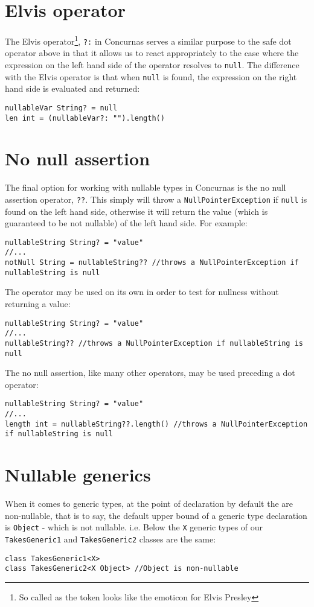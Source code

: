 \documentclass[conc-doc]{subfiles}
\begin{document}
\section{Elvis operator}
The Elvis operator\footnote{So called as the token looks like the emoticon for Elvis Presley}, \lstinline{?:} in Concurnas serves a similar purpose to the safe dot operator above in that it allows us to react appropriately to the case where the expression on the left hand side of the operator resolves to \lstinline{null}. The difference with the Elvis operator is that when \lstinline{null} is found, the expression on the right hand side is evaluated and returned:

\begin{lstlisting}
nullableVar String? = null
len int = (nullableVar?: "").length()
\end{lstlisting}

\section{No null assertion}
The final option for working with nullable types in Concurnas is the no null assertion operator, \lstinline{??}. This simply will throw a \lstinline{NullPointerException} if \lstinline{null} is found on the left hand side, otherwise it will return the value (which is guaranteed to be not nullable) of the left hand side. For example:

\begin{lstlisting}
nullableString String? = "value"
//...
notNull String = nullableString?? //throws a NullPointerException if nullableString is null
\end{lstlisting}

The operator may be used on its own in order to test for nullness without returning a value:

\begin{lstlisting}
nullableString String? = "value"
//...
nullableString?? //throws a NullPointerException if nullableString is null
\end{lstlisting}

The no null assertion, like many other operators, may be used preceding a dot operator:

\begin{lstlisting}
nullableString String? = "value"
//...
length int = nullableString??.length() //throws a NullPointerException if nullableString is null
\end{lstlisting}

\section{Nullable generics}
When it comes to generic types, at the point of declaration by default the are non-nullable, that is to say, the default upper bound of a generic type declaration is \lstinline{Object} - which is not nullable. i.e. Below the \lstinline{X} generic types of our \lstinline{TakesGeneric1} and \lstinline{TakesGeneric2} classes are the same:
\begin{lstlisting}
class TakesGeneric1<X>
class TakesGeneric2<X Object> //Object is non-nullable
\end{lstlisting}
\end{document}

